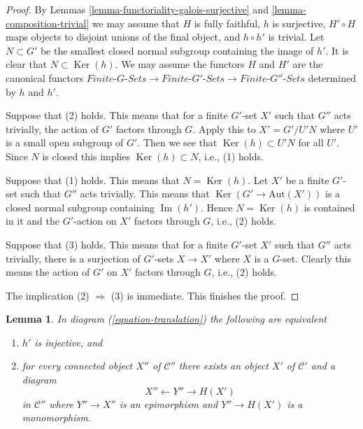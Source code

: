 \documentclass{stacks-project}
\theoremstyle{plain}
\newtheorem{lemma}[subsection]{Lemma}
\theoremstyle{definition}
\theoremstyle{remark}
\numberwithin{equation}{subsection}
\def\Ker{\mathop{\mathrm{Ker}}}
\def\Im{\mathop{\mathrm{Im}}}
\begin{document}
\begin{proof}
By Lemmas \ref{lemma-functoriality-galois-surjective} and
\ref{lemma-composition-trivial} we may assume that
$H$ is fully faithful, $h$ is surjective, $H' \circ H$ maps
objects to disjoint unions of the final object, and $h \circ h'$
is trivial. Let $N \subset G'$ be the smallest closed normal
subgroup containing the image of $h'$. It is clear that
$N \subset \Ker(h)$.
We may assume the functors $H$ and $H'$ are the canonical functors
$\textit{Finite-}G\textit{-Sets} \to \textit{Finite-}G'\textit{-Sets}
\to \textit{Finite-}G''\textit{-Sets}$ determined by $h$ and $h'$.

\medskip\noindent
Suppose that (2) holds. This means that for a finite $G'$-set $X'$
such that $G''$ acts trivially, the action of $G'$ factors through $G$.
Apply this to $X' = G'/U'N$ where $U'$ is a small open subgroup of $G'$.
Then we see that $\Ker(h) \subset U'N$ for all $U'$. Since $N$ is closed
this implies $\Ker(h) \subset N$, i.e., (1) holds.

\medskip\noindent
Suppose that (1) holds. This means that $N = \Ker(h)$. Let $X'$ be a
finite $G'$-set such that $G''$ acts trivially. This means that
$\Ker(G' \to \text{Aut}(X'))$ is a closed normal subgroup containing
$\Im(h')$. Hence $N = \Ker(h)$ is contained in it and the $G'$-action
on $X'$ factors through $G$, i.e., (2) holds.

\medskip\noindent
Suppose that (3) holds. This means that for a finite $G'$-set $X'$
such that $G''$ acts trivially, there is a surjection of $G'$-sets
$X \to X'$ where $X$ is a $G$-set. Clearly this means the action of
$G'$ on $X'$ factors through $G$, i.e., (2) holds.

\medskip\noindent
The implication (2) $\Rightarrow$ (3) is immediate. This finishes the proof.
\end{proof}

\begin{lemma}
\label{lemma-functoriality-galois-injective}
In diagram (\ref{equation-translation}) the following are equivalent
\begin{enumerate}
\item $h'$ is injective, and
\item for every connected object $X''$ of $\mathcal{C}''$
there exists an object $X'$ of $\mathcal{C}'$ and a diagram
$$
X'' \leftarrow Y'' \rightarrow H(X')
$$
in $\mathcal{C}''$ where $Y'' \to X''$ is an epimorphism and
$Y'' \to H(X')$ is a monomorphism.
\end{enumerate}
\end{lemma}
\end{document}
